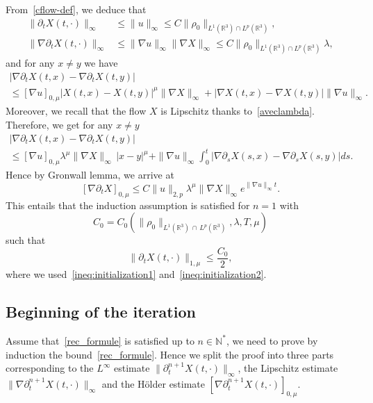\documentclass[10pt]{amsart}
\theoremstyle{definition}\newtheorem{defi}[theo]{Definition}\newtheorem{rema}[theo]{Remark}\newtheorem{exam}[theo]{Example}\newtheorem{exem}[theo]{Example}\newtheorem{nota}[theo]{Notation}
\newcommand{\R}{\mathbb{R}}
\newcommand{\N}{\mathbb{N}}
\renewcommand{\leq}{\leqslant}
\begin{document}
From~\eqref{cflow-def}, we deduce that
\begin{align}
\|\partial_t X(t,\cdot)\|_\infty &\leq \|u\|_\infty \leq C \|\rho_0\|_{L^1(\R^3)\cap L^p(\R^3)},\label{ineq:initialization1}
\\
\|\nabla \partial_t X(t,\cdot)\|_\infty &\leq \|\nabla u\|_\infty \|\nabla X \|_\infty \leq C \|\rho_0\|_{L^1(\R^3)\cap L^p(\R^3)} \lambda, \label{ineq:initialization2}
\end{align}
and for any $x \neq y$ we have
\begin{multline*}
\big|\nabla \partial_t X(t,x)-\nabla \partial_t X(t,y)\big| \\
\leq [\nabla u]_{0,\mu}|X(t,x)-X(t,y)|^\mu \|\nabla X\|_\infty + |\nabla X(t,x)-\nabla X(t,y)| \|\nabla u\|_\infty.
\end{multline*}
Moreover, we recall that the flow $X$ is Lipschitz thanks to~\eqref{aveclambda}. Therefore, we get for any $x \neq y $
\begin{multline*}
\big|\nabla \partial_t X(t,x)-\nabla \partial_t X(t,y)\big| \\ \leq [\nabla u]_{0,\mu} \lambda^\mu \|\nabla X\|_\infty\, |x-y|^\mu +
\|\nabla u\|_\infty \int_0^t\big|\nabla \partial_s X(s,x)-\nabla\partial_s X(s,y)\big|ds.
\end{multline*}
Hence by Gronwall lemma, we arrive at
\[
[\nabla \partial_t X]_{0,\mu} \leq C\|u\|_{2,p}\lambda^\mu \|\nabla X\|_\infty e^{\|\nabla u\|_\infty t}.
\]
This entails that the induction assumption is satisfied
for $n=1$ with
\[
C_0=C_0\left(\|\rho_0\|_{L^1(\R^3)\,\cap\,L^p(\R^3)}, \lambda, T,\mu\right)
\]
such that
\begin{equation}
\|\partial_t X(t,\cdot)\|_{1,\mu} \leq \frac{C_0}{2},
\end{equation}
where we used~\eqref{ineq:initialization1} and~\eqref{ineq:initialization2}.



\subsection{Beginning of the iteration}

Assume that~\eqref{rec_formule} is satisfied up to $n \in \N^*$, we need to prove by induction the bound~\eqref{rec_formule}. Hence we split the proof into three parts corresponding to the $L^\infty$ estimate $\|\partial_t^{n+1} X(t,\cdot)\|_\infty$, the Lipschitz estimate $\|\nabla \partial_t^{n+1} X(t,\cdot)\|_\infty$ and the H\"older estimate $[\nabla \partial_t^{n+1} X(t,\cdot)]_{0,\mu}$.
\end{document}
